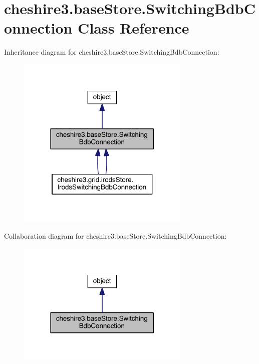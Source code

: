 \hypertarget{classcheshire3_1_1base_store_1_1_switching_bdb_connection}{\section{cheshire3.\-base\-Store.\-Switching\-Bdb\-Connection Class Reference}
\label{classcheshire3_1_1base_store_1_1_switching_bdb_connection}
}


Inheritance diagram for cheshire3.\-base\-Store.\-Switching\-Bdb\-Connection\-:
\nopagebreak
\begin{figure}[H]
\begin{center}
\leavevmode
\includegraphics[width=234pt]{classcheshire3_1_1base_store_1_1_switching_bdb_connection__inherit__graph}
\end{center}
\end{figure}


Collaboration diagram for cheshire3.\-base\-Store.\-Switching\-Bdb\-Connection\-:
\nopagebreak
\begin{figure}[H]
\begin{center}
\leavevmode
\includegraphics[width=234pt]{classcheshire3_1_1base_store_1_1_switching_bdb_connection__coll__graph}
\end{center}
\end{figure}
